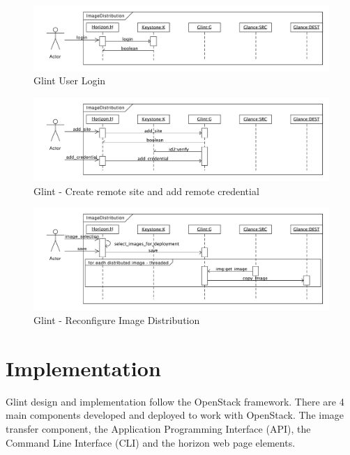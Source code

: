 \documentclass[a4paper]{jpconf}
\begin{document}
\begin{figure}[h]
\begin{center}
\includegraphics[width=36pc]{images/glintlogin.pdf}
\caption{\label{fig:glintlogin}Glint User Login}
\end{center}
\end{figure}

\begin{figure}[h]
\begin{center}
\includegraphics[width=36pc]{images/glintsitecred.pdf}
\caption{\label{fig:glintsitecred}Glint - Create remote site and add remote credential}
\end{center}
\end{figure}

\begin{figure}[h]
\begin{center}
\includegraphics[width=36pc]{images/glintdist.pdf}
\caption{\label{fig:glintdist}Glint - Reconfigure Image Distribution}
\end{center}
\end{figure}

\section{Implementation}

Glint design and implementation follow the OpenStack framework. There are 4 main components developed and deployed to work with OpenStack. The image transfer component, the Application Programming Interface (API), the Command Line Interface (CLI) and the horizon web page elements. 
\end{document}
